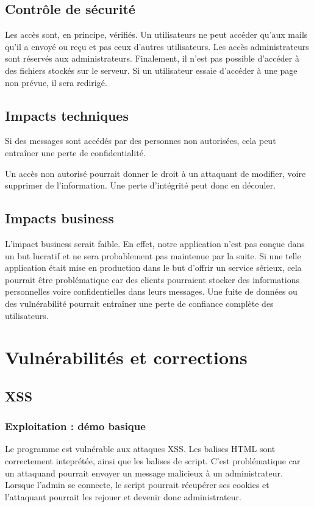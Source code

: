 \documentclass[12pt]{article}
\begin{document}
\subsection{Contrôle de sécurité}
Les accès sont, en principe, vérifiés. Un utilisateurs ne peut accéder qu'aux mails qu'il a envoyé ou reçu et pas ceux d'autres utilisateurs. Les accès administrateurs sont réservés aux administrateurs. Finalement, il n'est pas possible d'accéder à des fichiers stockés sur le serveur. Si un utilisateur essaie d'accéder à une page non prévue, il sera redirigé.

\subsection{Impacts techniques}
Si des messages sont accédés par des personnes non autorisées, cela peut entraîner une perte de confidentialité.

Un accès non autorisé pourrait donner le droit à un attaquant de modifier, voire supprimer de l'information. Une perte d'intégrité peut donc en découler.

\subsection{Impacts business}
L'impact business serait faible. En effet, notre application n'est pas conçue dans un but lucratif et ne sera probablement pas maintenue par la suite. Si une telle application était mise en production dans le but d'offrir un service sérieux, cela pourrait être problématique car des clients pourraient stocker des informations personnelles voire confidentielles  dans leurs messages. Une fuite de données ou des vulnérabilité pourrait entraîner une perte de confiance complète des utilisateurs.

\section{Vulnérabilités et corrections}
\subsection{XSS}
\subsubsection{Exploitation : démo basique}
Le programme est vulnérable aux attaques XSS. Les balises HTML sont correctement inteprétée, ainsi que les balises de script. C'est problématique car un attaquand pourrait envoyer un message malicieux à un administrateur. Lorsque l'admin se connecte, le script pourrait récupérer ses cookies et l'attaquant pourrait les rejouer et devenir donc administrateur.
\end{document}
